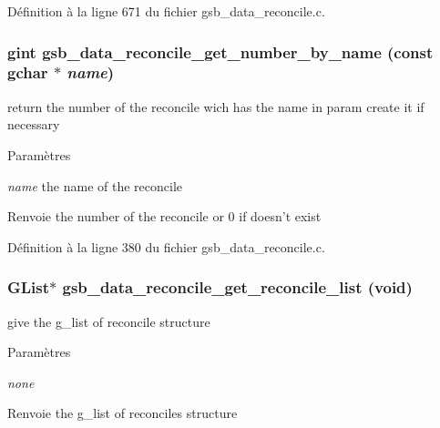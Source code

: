 Définition à la ligne 671 du fichier gsb\_\-data\_\-reconcile.c.

\subsubsection[{gsb\_\-data\_\-reconcile\_\-get\_\-number\_\-by\_\-name}]{\setlength{\rightskip}{0pt plus 5cm}gint gsb\_\-data\_\-reconcile\_\-get\_\-number\_\-by\_\-name (const gchar $\ast$ {\em name})}\label{gsb__data__reconcile_8h_a839ed7c90982127f0994a6472ba2f8bf}
return the number of the reconcile wich has the name in param create it if necessary


\begin{DoxyParams}{Paramètres}
\item[{\em name}]the name of the reconcile\end{DoxyParams}
\begin{DoxyReturn}{Renvoie}
the number of the reconcile or 0 if doesn't exist 
\end{DoxyReturn}


Définition à la ligne 380 du fichier gsb\_\-data\_\-reconcile.c.

\subsubsection[{gsb\_\-data\_\-reconcile\_\-get\_\-reconcile\_\-list}]{\setlength{\rightskip}{0pt plus 5cm}GList$\ast$ gsb\_\-data\_\-reconcile\_\-get\_\-reconcile\_\-list (void)}\label{gsb__data__reconcile_8h_aa78fc612a3b6c450f074b879633c6db3}
give the g\_\-list of reconcile structure


\begin{DoxyParams}{Paramètres}
\item[{\em none}]\end{DoxyParams}
\begin{DoxyReturn}{Renvoie}
the g\_\-list of reconciles structure 
\end{DoxyReturn}



